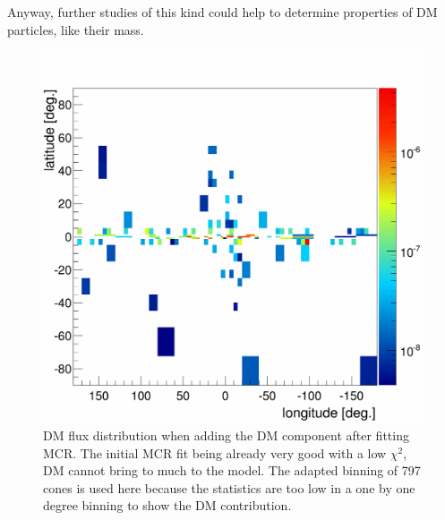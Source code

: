 Anyway, further studies of this kind could help to determine properties of DM particles, like their mass.

\begin{figure}[H]
	\centering
	\includegraphics[width=.5\linewidth]{pic/discussion/DMlate_DM_distribution.png}
	\caption[DM distribution after fitting a MCR excess]{DM flux distribution when adding the DM component after fitting MCR. The initial MCR fit being already very good with a low $\chi^2$, DM cannot bring to much to the model. The adapted binning of 797 cones is used here because the statistics are too low in a one by one degree binning to show the DM contribution.}
	\label{fig:DMlate_distribution}
\end{figure}





